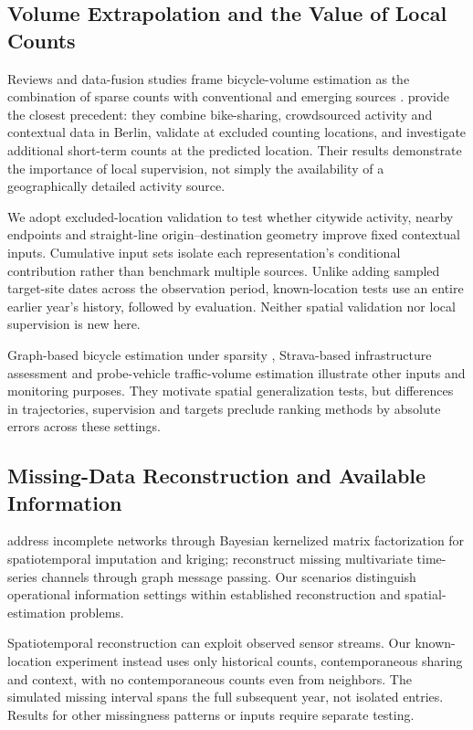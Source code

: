 \documentclass[]{interact}
\begin{document}
\subsection{Volume Extrapolation and the Value of Local Counts}
Reviews and data-fusion studies frame bicycle-volume estimation as the combination of sparse counts with conventional and emerging sources \citep{bhowmick2023,kothuri2022,miah2023}. \citet{kaiser2025} provide the closest precedent: they combine bike-sharing, crowdsourced activity and contextual data in Berlin, validate at excluded counting locations, and investigate additional short-term counts at the predicted location. Their results demonstrate the importance of local supervision, not simply the availability of a geographically detailed activity source.

We adopt excluded-location validation to test whether citywide activity, nearby endpoints and straight-line origin--destination geometry improve fixed contextual inputs. Cumulative input sets isolate each representation's conditional contribution rather than benchmark multiple sources. Unlike adding sampled target-site dates across the observation period, known-location tests use an entire earlier year's history, followed by evaluation. Neither spatial validation nor local supervision is new here.

Graph-based bicycle estimation under sparsity \citep{gupta2025}, Strava-based infrastructure assessment \citep{tori2026} and probe-vehicle traffic-volume estimation \citep{eisinga2025} illustrate other inputs and monitoring purposes. They motivate spatial generalization tests, but differences in trajectories, supervision and targets preclude ranking methods by absolute errors across these settings.

\subsection{Missing-Data Reconstruction and Available Information}
\citet{lei2022} address incomplete networks through Bayesian kernelized matrix factorization for spatiotemporal imputation and kriging; \citet{cini2022} reconstruct missing multivariate time-series channels through graph message passing. Our scenarios distinguish operational information settings within established reconstruction and spatial-estimation problems.

Spatiotemporal reconstruction can exploit observed sensor streams. Our known-location experiment instead uses only historical counts, contemporaneous sharing and context, with no contemporaneous counts even from neighbors. The simulated missing interval spans the full subsequent year, not isolated entries. Results for other missingness patterns or inputs require separate testing.
\end{document}
